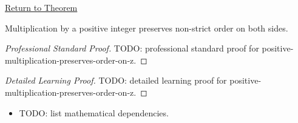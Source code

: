 \newpage
{}
\label{prf:positive-multiplication-preserves-order-on-z}

\begin{remark*}[Return]
\hyperref[thm:positive-multiplication-preserves-order-on-z]{Return to Theorem}
\end{remark*}

\begin{theorem*}
Multiplication by a positive integer preserves non-strict order on both sides.
\end{theorem*}

\begin{proof}[Professional Standard Proof]
\LRAProofBodyStart
TODO: professional standard proof for positive-multiplication-preserves-order-on-z.
\end{proof}

\begin{proof}[Detailed Learning Proof]
\LRAProofBodyStart
TODO: detailed learning proof for positive-multiplication-preserves-order-on-z.
\end{proof}

\begin{remark*}
\end{remark*}

\begin{dependencies}
\begin{itemize}
  \item TODO: list mathematical dependencies.
\end{itemize}
\end{dependencies}

\clearpage
